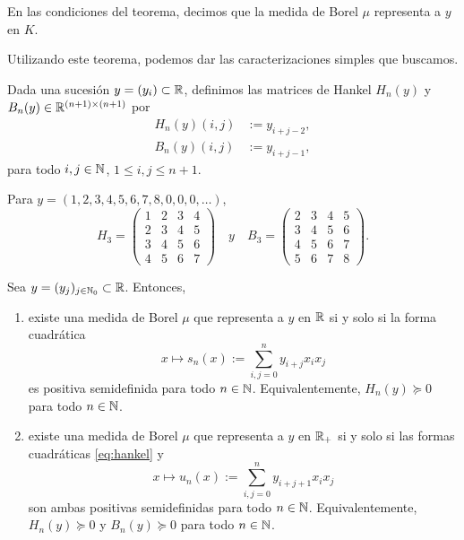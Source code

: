 En las condiciones del teorema, decimos que la medida de Borel $\mu$ representa a $y$ en $K$.

Utilizando este teorema, podemos dar las caracterizaciones simples que buscamos.

Dada una sucesión $y = (y_i) \subset \mathbb{R}$, definimos las matrices de Hankel $H_n(y)$ y $B_n(y) \in \mathbb{R}^{(n+1) \times (n+1)}$ por
\begin{align*}
H_n(y)(i,j) &:= y_{i+j-2}, \\
B_n(y)(i,j) &:= y_{i+j-1},
\end{align*}
para todo $i, j \in \mathbb{N}$, $1 \le i,j \le n+1$.

\begin{example}
Para $y = (1,2,3,4,5,6,7,8,0,0,0, \dots)$,
$$
H_3 = \begin{pmatrix}
1 & 2 & 3 & 4\\
2 & 3 & 4 & 5\\
3 & 4 & 5 & 6\\
4 & 5 & 6 & 7
\end{pmatrix}
\quad y \quad
B_3 = \begin{pmatrix}
2 & 3 & 4 & 5 \\
3 & 4 & 5 & 6 \\
4 & 5 & 6 & 7 \\
5 & 6 & 7 & 8
\end{pmatrix}.
$$
\end{example}

\begin{theorem}
Sea $y = (y_j)_{j \in \mathbb{N}_0} \subset \mathbb{R}$. Entonces,
\begin{enumerate}
\item \label{it:hankel} existe una medida de Borel $\mu$ que representa a $y$ en $\mathbb{R}$ si y solo si la forma cuadrática
\begin{equation}
\label{eq:hankel}
x \mapsto s_n(x) := \sum_{i,j = 0}^n y_{i+j} x_i x_j
\end{equation}
es positiva semidefinida para todo $n \in \mathbb{N}$. Equivalentemente, $H_n(y) \succeq 0$ para todo $n \in \mathbb{N}$.

\item \label{it:hankelu} existe una medida de Borel $\mu$ que representa a $y$ en $\mathbb{R}_+$ si y solo si las formas cuadráticas \ref{eq:hankel} y
\begin{equation}
\label{eq:hankelu}
x \mapsto u_n(x) := \sum_{i,j = 0}^n y_{i+j+1} x_i x_j
\end{equation}
son ambas positivas semidefinidas para todo $n \in \mathbb{N}$. Equivalentemente, $H_n(y) \succeq 0$ y $B_n(y) \succeq 0$ para todo $n \in \mathbb{N}$.
\end{enumerate}
\end{theorem}

